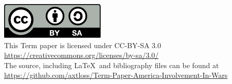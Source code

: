 \includegraphics{by-sa.pdf}\\
This Term paper is licensed under CC-BY-SA 3.0\\
\url{https://creativecommons.org/licenses/by-sa/3.0/}\\
The source, including \LaTeX\  and bibliography files can be found at\\ \url{https://github.com/axtloss/Term-Paper-America-Involvement-In-Wars}